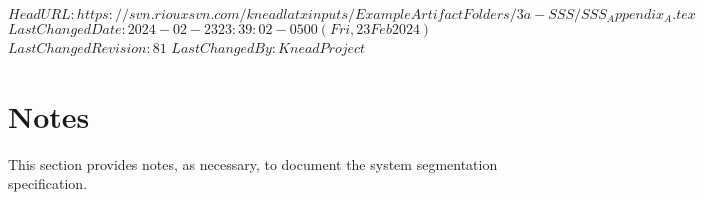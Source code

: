\svnidlong
{$HeadURL: https://svn.riouxsvn.com/kneadlatxinputs/ExampleArtifactFolders/3a-SSS/SSS_Appendix_A.tex $}
{$LastChangedDate: 2024-02-23 23:39:02 -0500 (Fri, 23 Feb 2024) $}
{$LastChangedRevision: 81 $}
{$LastChangedBy: KneadProject $}

\chapter{Notes}

This section provides notes, as necessary, to document the system segmentation specification.